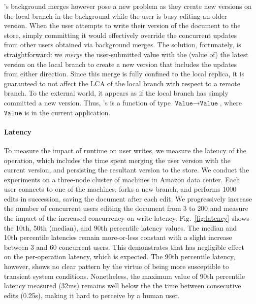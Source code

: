 \quark's background merges however pose a new problem as they create
new versions on the local branch in the background while the user is
busy editing an older version. When the user attempts to write their
version of the document to the store, simply committing it would
effectively override the concurrent updates from other users obtained
via background merges. The solution, fortunately, is straightforward:
we \emph{merge} the user-submitted value with the (value of) the
latest version on the local branch to create a new version that
includes the updates from either direction. Since this merge is fully
confined to the local replica, it is guaranteed to not affect the LCA
of the local branch with respect to a remote branch. To the external
world, it appears as if the local branch has simply committed a new
version.
Thus, \quark's  is a function of type $\texttt{Value}
\rightarrow \texttt{Value}$, where $\texttt{Value}$ is  in the
current application.

\noindent\paragraph{Latency} To measure the impact of \quark runtime on user
writes, we measure the latency of the  operation, which
includes the time spent merging the user version with the current
version, and persisting the resultant version to the store. We conduct
the experiments on a three-node cluster of  machines in
Amazon  data center. Each user connects to one of the
machines, forks a new branch, and performs 1000 edits in succession,
saving the document after each edit. We progressively increase the
number of concurrent users editing the document from 3 to 200 and
measure the impact of the increased concurrency on write latency.
Fig.~\ref{fig:latency} shows the 10th, 50th (median), and 90th
percentile latency values. The median and 10th percentile latencies
remain more-or-less constant with a slight increase between 3 and 60
concurrent users. This demonstrates that \quark has negligible effect
on the per-operation latency, which is expected. The 90th percentile
latency, however, shows no clear pattern by the virtue of being more
susceptible to transient system conditions. Nonetheless, the maximum
value of 90th percentile latency measured (32ms) remains well below
the the time between consecutive edits (0.25s), making it hard to
perceive by a human user. 

